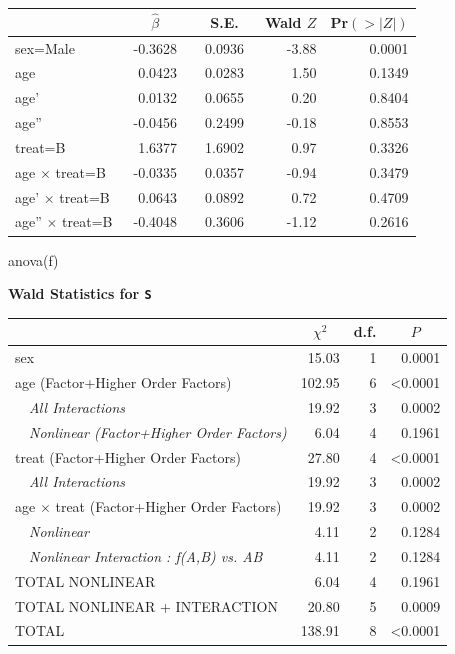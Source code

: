  \setlongtables\begin{longtable}{lrrrr}\hline
 \multicolumn{1}{l}{}&\multicolumn{1}{c}{$\hat{\beta}$}&\multicolumn{1}{c}{S.E.}&\multicolumn{1}{c}{Wald $Z$}&\multicolumn{1}{c}{Pr$(>|Z|)$}\tabularnewline
 \hline
 \endhead
 \hline
 \endfoot
 sex=Male&~-0.3628~&~0.0936~&-3.88&0.0001\tabularnewline
 age&~ 0.0423~&~0.0283~& 1.50&0.1349\tabularnewline
 age'&~ 0.0132~&~0.0655~& 0.20&0.8404\tabularnewline
 age''&~-0.0456~&~0.2499~&-0.18&0.8553\tabularnewline
 treat=B&~ 1.6377~&~1.6902~& 0.97&0.3326\tabularnewline
 age $\times$ treat=B&~-0.0335~&~0.0357~&-0.94&0.3479\tabularnewline
 age' $\times$ treat=B&~ 0.0643~&~0.0892~& 0.72&0.4709\tabularnewline
 age'' $\times$ treat=B&~-0.4048~&~0.3606~&-1.12&0.2616\tabularnewline
 \hline
 \end{longtable}
 \addtocounter{table}{-1}
\begin{Sinput}
anova(f)
\end{Sinput}
\textbf{\Needspace{2in}
Wald Statistics for \texttt{\smaller S}}\begin{center}
\begin{tabular}{lrrr}
\hline\hline
\multicolumn{1}{l}{}&\multicolumn{1}{c}{$\chi^{2}$}&\multicolumn{1}{c}{d.f.}&\multicolumn{1}{c}{$P$}\tabularnewline
\hline
sex& 15.03&1&0.0001\tabularnewline
age  (Factor+Higher Order Factors)&102.95&6&\textless 0.0001\tabularnewline
~~\emph{All Interactions}& 19.92&3&0.0002\tabularnewline
~~\emph{Nonlinear (Factor+Higher Order Factors)}&  6.04&4&0.1961\tabularnewline
treat  (Factor+Higher Order Factors)& 27.80&4&\textless 0.0001\tabularnewline
~~\emph{All Interactions}& 19.92&3&0.0002\tabularnewline
age $\times$ treat  (Factor+Higher Order Factors)& 19.92&3&0.0002\tabularnewline
~~\emph{Nonlinear}&  4.11&2&0.1284\tabularnewline
~~\emph{Nonlinear Interaction : f(A,B) vs. AB}&  4.11&2&0.1284\tabularnewline
TOTAL NONLINEAR&  6.04&4&0.1961\tabularnewline
TOTAL NONLINEAR + INTERACTION& 20.80&5&0.0009\tabularnewline
TOTAL&138.91&8&\textless 0.0001\tabularnewline
\hline
\end{tabular}\end{center}

